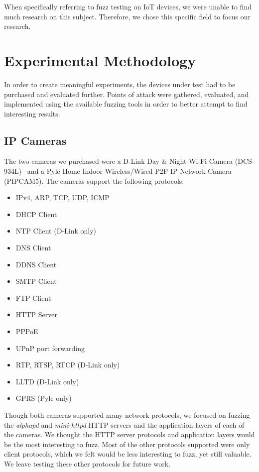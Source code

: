 \documentclass[letterpaper,twocolumn,10pt]{article}
\begin{document}
When specifically referring to fuzz testing on IoT devices, we were unable to find much research on this subject. Therefore, we chose this specific field to focus our research.

\section{Experimental Methodology}
In order to create meaningful experiments, the devices under test had to be purchased and evaluated further. Points of attack were gathered, evaluated, and implemented using the available fuzzing tools in order to better attempt to find interesting results.   

\subsection{IP Cameras}
The two cameras we purchased were a D-Link Day \& Night Wi-Fi Camera (DCS-934L)~\cite{dlinkCam} and a Pyle Home Indoor Wireless/Wired P2P IP Network Camera (PIPCAM5). The cameras support the following protocols:
\begin{itemize}
	\itemsep-.5em
	\item IPv4, ARP, TCP, UDP, ICMP
	\item DHCP Client
	\item NTP Client (D-Link only)
	\item DNS Client
	\item DDNS Client
	\item SMTP Client
	\item FTP Client
	\item HTTP Server
	\item PPPoE
	\item UPnP port forwarding
	\item RTP, RTSP, RTCP (D-Link only)
	\item LLTD (D-Link only)
	\item GPRS (Pyle only)
\end{itemize}
Though both cameras supported many network protocols, we focused on fuzzing the \textit{alphapd} and \textit{mini-httpd} HTTP servers and the application layers of each of the cameras. We thought the HTTP server protocols and application layers would be the most interesting to fuzz. Most of the other protocols supported were only client protocols, which we felt would be less interesting to fuzz, yet still valuable. We leave testing these other protocols for future work. 
\end{document}
